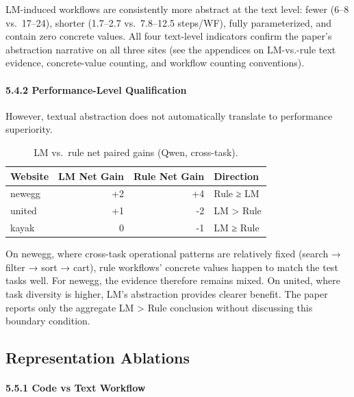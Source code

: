 \documentclass{article}
\begin{document}
LM-induced workflows are consistently more abstract at the text level:
fewer (6--8 vs.~17--24), shorter (1.7--2.7 vs.~7.8--12.5 steps/WF),
fully parameterized, and contain zero concrete values. All four
text-level indicators confirm the paper's abstraction narrative on all
three sites (see the appendices on LM-vs.-rule text evidence,
concrete-value counting, and workflow counting conventions).

\paragraph{5.4.2 Performance-Level
Qualification}\label{performance-level-qualification}

However, textual abstraction does not automatically translate to
performance superiority.

{\begin{longtable}[]{@{}lrrl@{}}
\caption{LM vs.~rule net paired gains (Qwen, cross-task).}\label{tab:lm-vs-rule-net-paired-gains-qwen-cross-task}\\

\toprule\noalign{}
Website & LM Net Gain & Rule Net Gain & Direction \\
\midrule\noalign{}
\endhead
\bottomrule\noalign{}
\endlastfoot
newegg & +2 & +4 & Rule ≥ LM \\
united & +1 & -2 & LM \textgreater{} Rule \\
kayak & 0 & -1 & LM ≥ Rule \\
\end{longtable}
}

On newegg, where cross-task operational patterns are relatively fixed
(search → filter → sort → cart), rule workflows' concrete values happen
to match the test tasks well. For newegg, the evidence therefore remains
mixed. On united, where task diversity is higher, LM's
abstraction provides clearer benefit. The paper reports only the
aggregate LM \textgreater{} Rule conclusion without discussing this
boundary condition.

\subsection{Representation
Ablations}\label{c4-representation-ablations}

\paragraph{5.5.1 Code vs Text Workflow}\label{code-vs-text-workflow}
\end{document}
